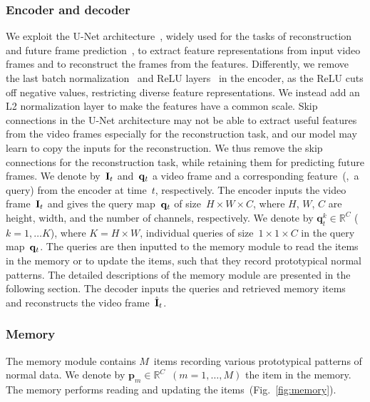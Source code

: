 \documentclass[10pt,twocolumn,letterpaper]{article}
\begin{document}
		\subsubsection{Encoder and decoder}\vspace{-0.2cm}
			We exploit the U-Net architecture~\cite{ronneberger2015u}, widely used for the tasks of reconstruction and future frame prediction~\cite{liu2018future}, to extract feature representations from input video frames and to reconstruct the frames from the features. Differently, we remove the last batch normalization~\cite{ioffe2015batch} and ReLU layers~\cite{krizhevsky2012imagenet} in the encoder, as the ReLU cuts off negative values, restricting diverse feature representations. We instead add an L2 normalization layer to make the features have a common scale. Skip connections in the U-Net architecture may not be able to extract useful features from the video frames especially for the reconstruction task, and our model may learn to copy the inputs for the reconstruction. We thus remove the skip connections for the reconstruction task, while retaining them for predicting future frames. We denote by~${\bf{I}}_t$ and~${\bf{q}}_t$ a video frame and a corresponding feature~(\ie,~a query) from the encoder at time~$t$, respectively. The encoder inputs the video frame~${\bf{I}}_t$ and gives the query map~${\bf{q}}_t$ of size~$H \times W \times C$, where $H$, $W$, $C$ are height, width, and the number of channels, respectively. We denote by $\mathbf{q}_t^k \in \mathbb{R}^{C}$ ($k=1,\dots K$), where $K=H\times W$, individual queries of size~$1 \times 1 \times C$ in the query map~${\bf{q}}_t$. The queries are then inputted to the memory module to read the items in the memory or to update the items, such that they record prototypical normal patterns. The detailed descriptions of the memory module are presented in the following section. The decoder inputs the queries and retrieved memory items and reconstructs the video frame~$\hat {\bf{I}}_t$.

    	\vspace{-0.4cm}
		\subsubsection{Memory}\vspace{-0.2cm}
			The memory module contains $M$~items recording various prototypical patterns of normal data. We denote by $\mathbf{p}_m \in \mathbb{R}^C$~$(m=1,\dots,M)$ the item in the memory. The memory performs reading and updating the items~(Fig.~\ref{fig:memory}). 
\end{document}
